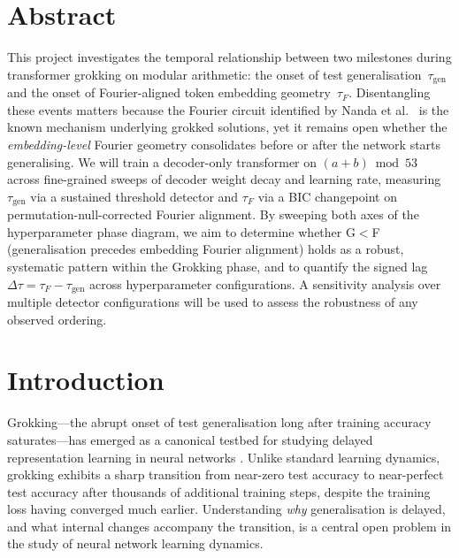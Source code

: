\documentclass[12pt,openany,a4paper]{book}
\newcommand{\taug}{\tau_{\mathrm{gen}}}
\newcommand{\tauf}{\tau_{F}}
\newcommand{\Dtau}{\Delta\tau}
\begin{document}
\chapter{Abstract}

This project investigates the temporal relationship between two
milestones during transformer grokking on modular arithmetic:
the onset of test generalisation~$\taug$ and the onset of
Fourier-aligned token embedding geometry~$\tauf$.
Disentangling these events matters because the Fourier circuit
identified by Nanda et al.~\cite{nanda2023progress} is the known mechanism underlying
grokked solutions, yet it remains open whether the \emph{embedding-level}
Fourier geometry consolidates before or after the network starts
generalising.
We will train a decoder-only transformer on $(a+b)\bmod 53$ across
fine-grained sweeps of decoder weight decay and learning rate,
measuring $\taug$ via a sustained threshold detector and $\tauf$ via a
BIC changepoint on permutation-null-corrected Fourier alignment.
By sweeping both axes of the hyperparameter phase diagram, we aim to
determine whether G$<$F (generalisation precedes embedding Fourier
alignment) holds as a robust, systematic pattern within the Grokking
phase, and to quantify the signed lag $\Dtau = \tauf - \taug$ across
hyperparameter configurations.
A sensitivity analysis over multiple detector configurations will be
used to assess the robustness of any observed ordering.

\tableofcontents

\listoffigures
{}

\listoftables
{}

\cleardoublepage
\mainmatter

\chapter{Introduction}

Grokking---the abrupt onset of test generalisation long after training
accuracy saturates---has emerged as a canonical testbed for studying
delayed representation learning in neural networks
\cite{power2022grokking}.
Unlike standard learning dynamics, grokking exhibits a sharp transition
from near-zero test accuracy to near-perfect test accuracy after
thousands of additional training steps, despite the training loss
having converged much earlier.
Understanding \emph{why} generalisation is delayed, and what internal
changes accompany the transition, is a central open problem in the
study of neural network learning dynamics.
\end{document}
